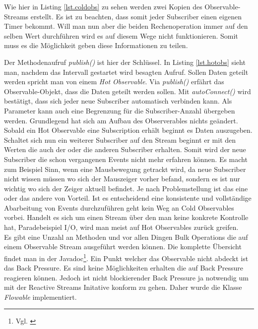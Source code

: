 
Wie hier in Listing \ref{lst.coldobs} zu sehen werden zwei Kopien des Observable-Streams erstellt. Es ist zu beachten, dass somit jeder Subscriber einen eigenen Timer bekommt. Will man nun aber die beiden Rechenoperation immer auf den selben Wert durchführen wird es auf diesem Wege nicht funktionieren. Somit muss es die Möglichkeit geben diese Informationen zu teilen.

Der Methodenaufruf \textit{publish()} ist hier der Schlüssel. In Listing \ref{lst.hotobs} sieht man, nachdem das Intervall gestartet wird besagten Aufruf. Sollen Daten geteilt werden spricht man von einem \textit{Hot Observable}. Via \textit{publish()} erfährt das Observable-Objekt, dass die Daten geteilt werden sollen. Mit \textit{autoConnect()} wird bestätigt, dass sich jeder neue Subscriber automatisch verbinden kann. Als Parameter kann auch eine Begrenzung für die Subscriber-Anzahl übergeben werden. Grundlegend hat sich am Aufbau des Observerables nichts geändert. Sobald ein Hot Observable eine Subscription erhält beginnt es Daten auszugeben. Schaltet sich nun ein weiterer Subscriber auf den Stream beginnt er mit den Werten die auch der oder die anderen Subscriber erhalten. Somit wird der neue Subscriber die schon vergangenen Events nicht mehr erfahren können. Es macht zum Beispiel Sinn, wenn eine Mausbewegung getrackt wird, da neue Subscriber nicht wissen müssen wo sich der Mauszeiger vorher befand, sondern es ist nur wichtig wo sich der Zeiger aktuell befindet. Je nach Problemstellung ist das eine oder das andere von Vorteil. Ist es entscheidend eine konsistente und vollständige Abarbeitung von Events durchzuführen geht kein Weg an Cold Observables vorbei. Handelt es sich um einen Stream über den man keine konkrete Kontrolle hat, Paradebeispiel I/O, wird man meist auf Hot Observables zurück greifen. \\ Es gibt eine Unzahl an Methoden und vor allen Dingen Bulk Operations die auf einem Observable Stream ausgeführt werden können. Die komplette Übersicht findet man in der Javadoc\footnote{Vgl. \cite{rx.javadoc}}. Ein Punkt welcher das Observable nicht abdeckt ist das Back Pressure. Es sind keine Möglichkeiten erhalten die auf Back Pressure reagieren können. Jedoch ist nicht blockierender Back Pressure ja notwendig um mit der Reactive Streams Initative konform zu gehen. Daher wurde die Klasse \textit{Flowable} implementiert.
